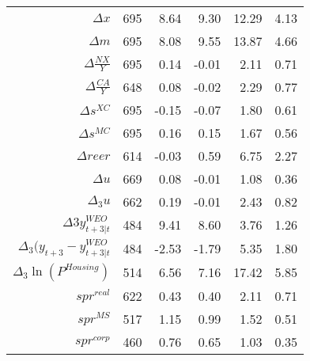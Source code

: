 \documentclass{ltjarticle}
\begin{document}
\begin{table}[hbtp]
\begin{center}
\begin{tabular}{rrrrrr}
            $\Delta{x}$ & 695 & 8.64 & 9.30 & 12.29 & 4.13 \\ 
            $\Delta{m}$ & 695 & 8.08 & 9.55 & 13.87 & 4.66 \\ 
            $\Delta\frac{NX}{Y}$ & 695 & 0.14 & -0.01 & 2.11 & 0.71 \\ 
            $\Delta\frac{CA}{Y}$ & 648 & 0.08 & -0.02 & 2.29 & 0.77 \\ 
            $\Delta s^{XC}$ & 695 & -0.15 & -0.07 & 1.80 & 0.61 \\ 
            $\Delta s^{MC}$ & 695 & 0.16 & 0.15 & 1.67 & 0.56 \\ 
            $\Delta reer$ & 614 & -0.03 & 0.59 & 6.75 & 2.27 \\ 
            $\Delta u$ & 669 & 0.08 & -0.01 & 1.08 & 0.36 \\ 
            $\Delta_{3}u$ & 662 & 0.19 & -0.01 & 2.43 & 0.82 \\ 
            $\Delta{3}y_{t+3|t}^{WEO}$ & 484 & 9.41 & 8.60 & 3.76 & 1.26 \\ 
            $\Delta_{3}(y_{t+3}-y_{t+3|t}^{WEO}$ & 484 & -2.53 & -1.79 & 5.35 & 1.80 \\ 
            $\Delta_{3}\ln(P^{Housing})$ & 514 & 6.56 & 7.16 & 17.42 & 5.85 \\ 
            $spr^{real}$ & 622 & 0.43 & 0.40 & 2.11 & 0.71 \\ 
            $spr^{MS}$ & 517 & 1.15 & 0.99 & 1.52 & 0.51 \\ 
            $spr^{corp}$ & 460 & 0.76 & 0.65 & 1.03 & 0.35 \\ 
               \hline
               \hline
        \end{tabular}
    \end{center}
    \begin{tablenotes}
        \small

\end{tablenotes}
\end{table}
\end{document}

